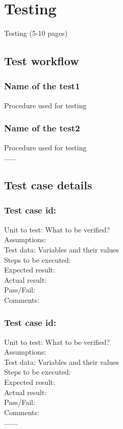 \chapter{Testing}
\graphicspath{{Testing/TestingFigs/EPS/}{Testing/TestingFigs/}}

Testing (5-10 pages)
\section{Test workflow}
\subsection{Name of the test1}
Procedure used for testing
\subsection{Name of the test2}
Procedure used for testing\\
......
\section{Test case details}
\subsection{Test case id:}
Unit to test: What to be verified?\\
Assumptions:\\
Test data: Variables and their values\\
Steps to be executed:\\
Expected result:\\
Actual result:\\
Pass/Fail:\\
Comments:
\subsection{Test case id:}
Unit to test: What to be verified?\\
Assumptions:\\
Test data: Variables and their values\\
Steps to be executed:\\
Expected result:\\
Actual result:\\
Pass/Fail:\\
Comments:\\
.......


